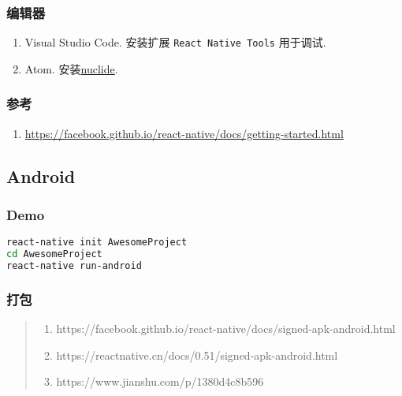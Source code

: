\subsubsection{编辑器}\label{ux7f16ux8f91ux5668}

\begin{enumerate}
\def\labelenumi{\arabic{enumi}.}
\tightlist
\item
  Visual Studio Code. 安装扩展 \lstinline!React Native Tools! 用于调试.
\item
  Atom. 安装\href{https://atom.io/packages/nuclide}{nuclide}.
\end{enumerate}

\subsubsection{参考}\label{ux53c2ux8003}

\begin{enumerate}
\def\labelenumi{\arabic{enumi}.}
\tightlist
\item
  \url{https://facebook.github.io/react-native/docs/getting-started.html}
\end{enumerate}

\subsection{Android}\label{android}

\subsubsection{Demo}\label{demo}

\begin{lstlisting}[language=bash]
react-native init AwesomeProject
cd AwesomeProject
react-native run-android
\end{lstlisting}

\subsubsection{打包}\label{ux6253ux5305}

\begin{quote}
\begin{enumerate}
\def\labelenumi{\arabic{enumi}.}
\tightlist
\item
  https://facebook.github.io/react-native/docs/signed-apk-android.html
\item
  https://reactnative.cn/docs/0.51/signed-apk-android.html
\item
  https://www.jianshu.com/p/1380d4c8b596
\end{enumerate}
\end{quote}

